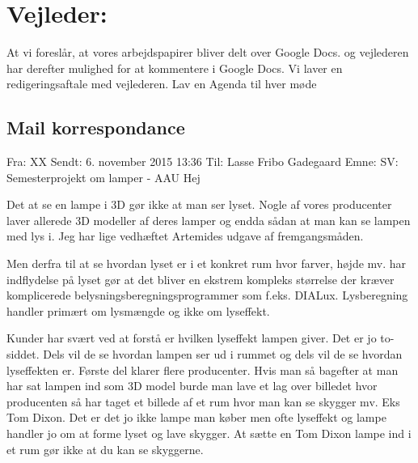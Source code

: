 \documentclass[oneside,a4paper,titlepage]{article}
\begin{document}
\section*{Vejleder:}
At vi foreslår, at vores arbejdspapirer bliver delt over Google Docs. og vejlederen har derefter mulighed for at kommentere i Google Docs. Vi laver en redigeringsaftale med vejlederen.
Lav en Agenda til hver møde
\clearpage
\subsection{Mail korrespondance}
Fra: XX \newline
Sendt: 6. november 2015 13:36 \newline
Til: Lasse Fribo Gadegaard\newline
Emne: SV: Semesterprojekt om lamper - AAU\newline
Hej
 
Det at se en lampe i 3D gør ikke at man ser lyset. Nogle af vores producenter laver allerede 3D modeller af deres lamper og endda sådan at man kan se lampen med lys i. Jeg har lige vedhæftet Artemides udgave af fremgangsmåden.

Men derfra til at se hvordan lyset er i et konkret rum hvor farver, højde mv. har indflydelse på lyset gør at det bliver en ekstrem kompleks størrelse der kræver komplicerede belysningsberegningsprogrammer som f.eks. DIALux. Lysberegning handler primært om lysmængde og ikke om lyseffekt.

Kunder har svært ved at forstå er hvilken lyseffekt lampen giver. Det er jo to-siddet. Dels vil de se hvordan lampen ser ud i rummet og dels vil de se hvordan lyseffekten er. Første del klarer flere producenter. Hvis man så bagefter at man har sat lampen ind som 3D model burde man lave et lag over billedet hvor producenten så har taget et billede af et rum hvor man kan se skygger mv. Eks Tom Dixon. Det er det jo ikke lampe man køber men ofte lyseffekt og lampe handler jo om at forme lyset og lave skygger. At sætte en Tom Dixon lampe ind i et rum gør ikke at du kan se skyggerne.
\end{document}
